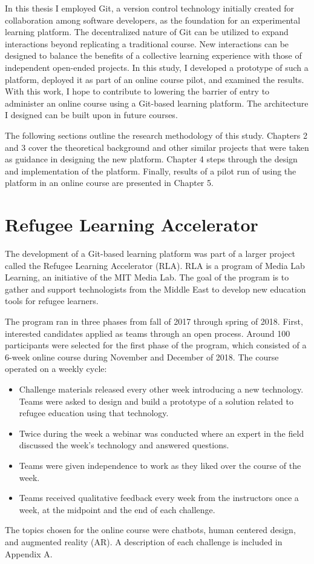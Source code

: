 \documentclass[12pt,twoside]{mitthesis}
\newcommand{\draft}[1]{{\color{blue} #1}}
\begin{document}
In this thesis I employed Git, a version control technology initially created for collaboration among software developers, as the foundation for an experimental learning platform. The decentralized nature of Git can be utilized to expand interactions beyond replicating a traditional course. New interactions can be designed to balance the benefits of a collective learning experience with those of independent open-ended projects. In this study, I developed a prototype of such a platform, deployed it as part of an online course pilot, and examined the results. With this work, I hope to contribute to lowering the barrier of entry to administer an online course using a Git-based learning platform. The architecture I designed can be built upon in future courses. 

The following sections outline the research methodology of this study. Chapters 2 and 3 cover the theoretical background and other similar projects that were taken as guidance in designing the new platform. Chapter 4 steps through the design and implementation of the platform. Finally, results of a pilot run of using the platform in an online course are presented in Chapter 5. 

\section{Refugee Learning Accelerator}

The development of a Git-based learning platform was part of a larger project called the Refugee Learning Accelerator (RLA). RLA is a program of Media Lab Learning, an initiative of the MIT Media Lab. The goal of the program is to gather and support technologists from the Middle East to develop new education tools for refugee learners. 

\draft{The program ran in three phases from fall of 2017 through spring of 2018. First, interested candidates applied as teams through an open process. Around 100 participants were selected for the first phase of the program, which consisted of a 6-week online course during November and December of 2018. The course operated on a weekly cycle:
\begin{itemize}
\item Challenge materials released every other week introducing a new technology. Teams were asked to design and build a prototype of a solution related to refugee education using that technology.
\item Twice during the week a webinar was conducted where an expert in the field discussed the week's technology and answered questions.
\item Teams were given independence to work as they liked over the course of the week.
\item Teams received qualitative feedback every week from the instructors once a week, at the midpoint and the end of each challenge.
\end{itemize}
The topics chosen for the online course were chatbots, human centered design, and augmented reality (AR). A description of each challenge is included in Appendix A.}
\end{document}
